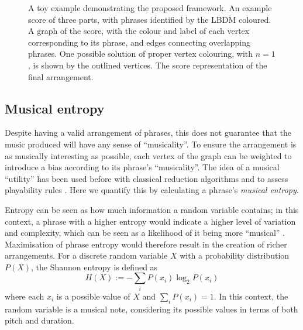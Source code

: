 \documentclass[12pt]{article}
\theoremstyle{definition}
\begin{document}
\begin{figure}[ht]
    \centering\footnotesize
    \begin{subfigure}{.8\textwidth}
        
        \caption{}
        \label{fig:toy-score}
    \end{subfigure}
    \par\bigskip
    \begin{subfigure}{0.5\textwidth}
        
        \caption{}
        \label{fig:toy-graph}
    \end{subfigure}
    \par\bigskip
    \begin{subfigure}{.8\textwidth}
        
        \caption{}
        \label{fig:toy-arrangement}
    \end{subfigure}

    \caption[A toy example demonstrating a simplified version of the proposed framework.]{A toy example demonstrating the proposed framework. \textbf{} An example score of three parts, with phrases identified by the LBDM coloured. \textbf{} A graph of the score, with the colour and label of each vertex corresponding to its phrase, and edges connecting overlapping phrases. One possible solution of proper vertex colouring, with $n=1$, is shown by the outlined vertices. \textbf{} The score representation of the final arrangement.}
    \label{fig:toy}
\end{figure}

\subsection{Musical entropy}

Despite having a valid arrangement of phrases, this does not guarantee that the music produced will have any sense of ``musicality''. To ensure the arrangement is as musically interesting as possible, each vertex of the graph can be weighted to introduce a bias according to its phrase's ``musicality''. The idea of a musical ``utility'' has been used before with classical reduction algorithms \cite{huang_towards_2012} and to assess playability rules \cite{chiu_automatic_2009}. Here we quantify this by calculating a phrase's \emph{musical entropy}.

Entropy can be seen as how much information a random variable contains; in this context, a phrase with a higher entropy would indicate a higher level of variation and complexity, which can be seen as a likelihood of it being more ``musical'' \cite{li_entropy_2019}. Maximisation of phrase entropy would therefore result in the creation of richer arrangements. For a discrete random variable $X$ with a probability distribution $P(X)$, the Shannon entropy is defined as
\begin{equation}
    H(X):=-\sum_i P(x_i)\log_2 P(x_i)
    \label{eq:entropy}
\end{equation}
where each $x_i$ is a possible value of $X$ and ${\sum_i P(x_i)=1}$. In this context, the random variable is a musical note, considering its possible values in terms of both pitch and duration.
\end{document}
